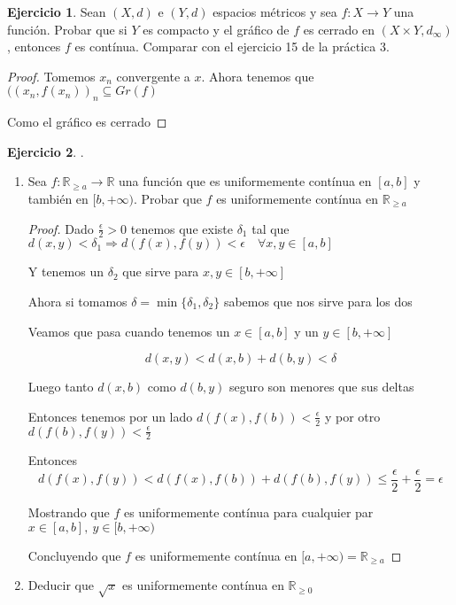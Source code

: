 \documentclass[11pt]{report}
\newcommand{\R}{\mathbb{R}}
\newcommand{\Ra}{\Rightarrow}
\newcommand{\ra}{\rightarrow}
\theoremstyle{definition}
\newtheorem{ej}{Ejercicio}
\begin{document}
	\begin{ej}
		Sean $(X,d)$ e $(Y,d)$ espacios métricos y sea $f : X \ra Y$ una función. Probar que si $Y$ es compacto y el gráfico de $f$ es cerrado en $(X\times Y, d_{\infty})$, entonces $f$ es contínua. Comparar con el ejercicio 15 de la práctica 3.
		\begin{proof}
			Tomemos $x_n$ convergente a $x$. Ahora tenemos que $((x_n,f(x_n))_n \subseteq Gr(f)$

			Como el gráfico es cerrado 

		\end{proof}
	\end{ej}
	
	\begin{ej}.
		\begin{enumerate}
			\item Sea $f : \R_{\geq a} \ra \R$ una función que es uniformemente contínua en $[a,b]$ y también en $[b,+\infty )$. Probar que $f$ es uniformemente contínua en $\R_{\geq a}$
				\begin{proof}
					Dado $\frac{\epsilon}{2} >0$ tenemos que existe $\delta_1$ tal que $d(x,y) < \delta_1 \Ra d(f(x),f(y))< \epsilon \quad \forall x,y \in [a,b]$

					Y tenemos un $\delta_2$ que sirve para $x,y \in [b,+\infty]$

					Ahora si tomamos $\delta = \min\{\delta_1,\delta_2\}$ sabemos que nos sirve para los dos

					Veamos que pasa cuando tenemos un $x \in [a,b]$ y un $y \in [b,+\infty]$

					$$d(x,y) < d(x,b) + d(b,y) < \delta$$ 

					Luego tanto $d(x,b)$ como $d(b,y)$ seguro son menores que sus deltas
					
					Entonces tenemos por un lado $d(f(x),f(b)) < \frac{\epsilon}{2}$ y por otro $d(f(b),f(y)) < \frac{\epsilon}{2}$

					Entonces $$ d(f(x),f(y)) < d(f(x),f(b)) + d(f(b),f(y)) \leq \frac{\epsilon}{2} + \frac{\epsilon}{2} = \epsilon$$
	
					Mostrando que $f$ es uniformemente contínua para cualquier par $x \in [a,b], \ y \in [b,+\infty)$  

					Concluyendo que $f$ es uniformemente contínua en $[a,+\infty) = \R_{\geq a}$
				\end{proof}
				
							
				
			\item Deducir que $\sqrt{x}$ es uniformemente contínua en $\R_{\geq 0}$
					

\end{enumerate}
\end{ej}
\end{document}
